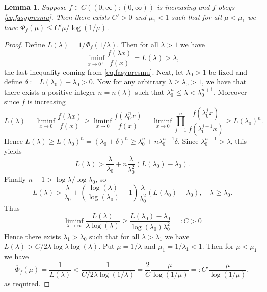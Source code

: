 \documentclass[a4paper,10pt,reqno]{amsart}
\numberwithin{equation}{section}
\newtheorem{lemma}{Lemma}
\theoremstyle{definition}
\theoremstyle{remark}
\DeclareMathOperator{\1}{\mathbbm 1}
\begin{document}
	\begin{lemma} \label{lemma.philogest}
		Suppose $f\in C((0,\infty);(0,\infty))$ is increasing and $f$ obeys \eqref{eq.fasypresmu}. Then there exists $C'>0$ and $\mu_1<1$ such that for all $\mu<\mu_1$ we have $\overline{\Phi}_f(\mu)\leq C'\mu/\log(1/\mu)$. 
	\end{lemma}	
	\begin{proof}
		Define $L(\lambda)=1/\overline{\Phi}_f(1/\lambda)$. Then for all $\lambda>1$ we have 
		\[
		\liminf_{x\to 0^+} \frac{f(\lambda x)}{f(x)}=L(\lambda)>\lambda,
		\]
		the last inequality coming from \eqref{eq.fasypresmu}. Next, let $\lambda_0>1$ be fixed and define $\delta:=L(\lambda_0)-\lambda_0>0$. 
		Now for any arbitrary $\lambda\geq \lambda_0>1$, we have that there exists a positive integer $n=n(\lambda)$ such that $\lambda_0^n \leq \lambda<\lambda_0^{n+1}$. Moreover since $f$ is increasing 
		\[
		L(\lambda)=\liminf_{x\to 0} \frac{f(\lambda x)}{f(x)}
		\geq \liminf_{x\to 0} \frac{f(\lambda_0^n x)}{f(x)}
		=\liminf_{x\to 0} \prod_{j=1}^n \frac{f(\lambda_0^j x)}{f(\lambda_0^{j-1}x)}
		\geq L(\lambda_0)^n.
		\]
		Hence $L(\lambda)\geq L(\lambda_0)^n=(\lambda_0+\delta)^n \geq \lambda_0^n + n \lambda_0^{n-1}\delta$. Since $\lambda_0^{n+1}>\lambda$, this yields
		\[
		L(\lambda)>\frac{\lambda}{\lambda_0}+n \frac{\lambda}{\lambda_0^2}(L(\lambda_0)-\lambda_0).
		\]
		Finally $n+1>\log \lambda/\log\lambda_0$, so 
		\[
		L(\lambda)>\frac{\lambda}{\lambda_0}+ \left(\frac{\log(\lambda)}{\log(\lambda_0)}-1\right) \frac{\lambda}{\lambda_0^2}(L(\lambda_0)-\lambda_0), \quad \lambda\geq \lambda_0.
		\]
		Thus 
		\[
		\liminf_{\lambda\to \infty} \frac{L(\lambda)}{\lambda\log(\lambda)}
		\geq \frac{L(\lambda_0)-\lambda_0}{\log(\lambda_0)\lambda_0^2}=:C>0
		\]
		Hence there exists $\lambda_1>\lambda_0$ such that for all $\lambda>\lambda_1$ we have $L(\lambda)>C/2 \lambda \log\lambda \log(\lambda)$. Put $\mu=1/\lambda$ and $\mu_1=1/\lambda_1<1$. Then for $\mu<\mu_1$ we have 
		\[
		\overline{\Phi}_f(\mu)=\frac{1}{L(\lambda)}<\frac{1}{C/2 \lambda\log(1/\lambda)}=\frac{2}{C}\frac{\mu}{\log(1/\mu)}=:C'\frac{\mu}{\log(1/\mu)},
		\]
		as required. 
	\end{proof}
	
\end{document}
